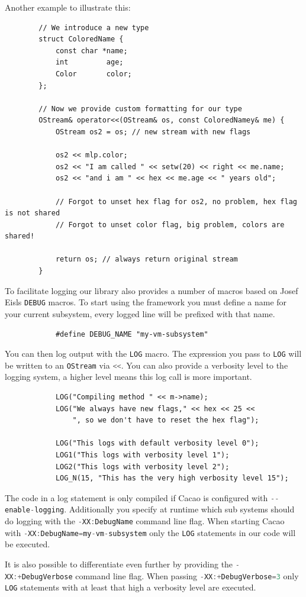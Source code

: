 \documentclass[12pt,a4paper,oneside]{article}
\newcommand{\cpp}[1]{\lstinline[language=C++]{#1}}
\begin{document}
	Another example to illustrate this:
		\begin{lstlisting}
		// We introduce a new type
		struct ColoredName {
			const char *name;
			int         age;
 			Color       color;
		};

		// Now we provide custom formatting for our type
		OStream& operator<<(OStream& os, const ColoredNamey& me) {
			OStream os2 = os; // new stream with new flags

			os2 << mlp.color;
			os2 << "I am called " << setw(20) << right << me.name;
			os2 << "and i am " << hex << me.age << " years old";

			// Forgot to unset hex flag for os2, no problem, hex flag is not shared
			// Forgot to unset color flag, big problem, colors are shared!

			return os; // always return original stream
		}
		\end{lstlisting}

	To facilitate logging our library also provides a number of macros based on Josef Eisls \cpp{DEBUG} macros.
	To start using the framework you must define a name for your current subsystem,
	every logged line will be prefixed with that name.
		\begin{lstlisting}
			#define DEBUG_NAME "my-vm-subsystem"
		\end{lstlisting}
	You can then log output with the \cpp{LOG} macro.
	The expression you pass to \cpp{LOG} will be written to an \cpp{OStream} via \cpp{<<}.
	You can also provide a verbosity level to the logging system, a higher level means this log call is more important.
		\begin{lstlisting}
			LOG("Compiling method " << m->name);
			LOG("We always have new flags," << hex << 25 << 
				", so we don't have to reset the hex flag");

			LOG("This logs with default verbosity level 0");
			LOG1("This logs with verbosity level 1");
			LOG2("This logs with verbosity level 2");
			LOG_N(15, "This has the very high verbosity level 15");
		\end{lstlisting}

	The code in a log statement is only compiled if Cacao is configured with \cpp{--enable-logging}.
	Additionally you specify at runtime which sub systems should do logging with the \cpp{-XX:DebugName} command line flag.
	When starting Cacao with \cpp{-XX:DebugName=my-vm-subsystem} only the \cpp{LOG} statements in our code will be executed.

	It is also possible to differentiate even further by providing the \cpp{-XX:+DebugVerbose} command line flag.
	When passing \cpp{-XX:+DebugVerbose=3} only \cpp{LOG} statements with at least that high a verbosity level are executed.
\end{document}
